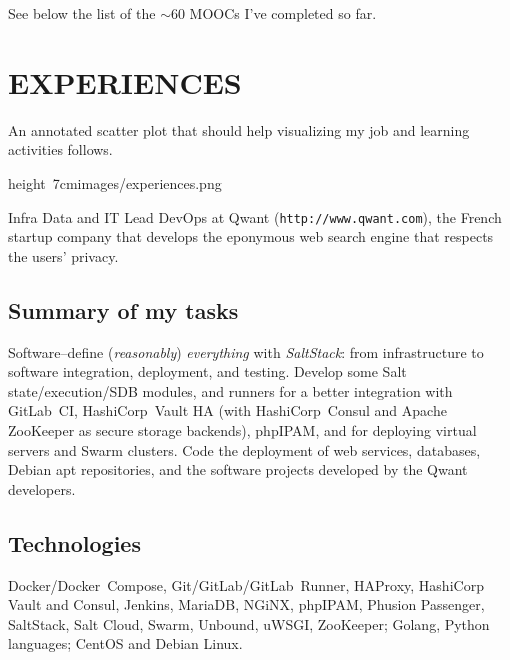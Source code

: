 \smallskip\nobreak\noindent
See below the list of the $\sim$60 MOOCs I've completed so far.
\vfill\eject


\section{EXPERIENCES}

An annotated scatter plot that should help visualizing my job and learning activities
follows.

\bigskip
\centerline{%
    \hbox{\pdfximage height 7cm{images/experiences.png}\pdfrefximage\pdflastximage}}
\smallskip



Infra Data and IT Lead DevOps at Qwant ({\tt http://www.qwant.com}), the
French startup company that develops the eponymous web search engine that respects
the users' privacy.

\subsection{Summary of my tasks}

\vskip 0pt\noindent
Software--define ({\it reasonably}\/) {\it everything\/} with {\it SaltStack\/}:
from infrastructure to software integration, deployment, and testing.
Develop some Salt state/execution/SDB modules, and runners for a better
integration with GitLab~CI, HashiCorp~Vault HA (with HashiCorp~Consul and
Apache ZooKeeper as secure storage backends), phpIPAM, and for deploying
virtual servers and Swarm clusters.
Code the deployment of web services, databases, Debian apt repositories, and the
software projects developed by the Qwant developers.

\subsection{Technologies}

\vskip 0pt\noindent
Docker/Docker~Compose, Git/GitLab/GitLab~Runner, HAProxy,
HashiCorp Vault and Consul, Jenkins, MariaDB, NGiNX, phpIPAM,
Phusion Passenger, SaltStack, Salt Cloud, Swarm, Unbound, uWSGI, ZooKeeper;
Golang, Python languages; CentOS and Debian Linux.

